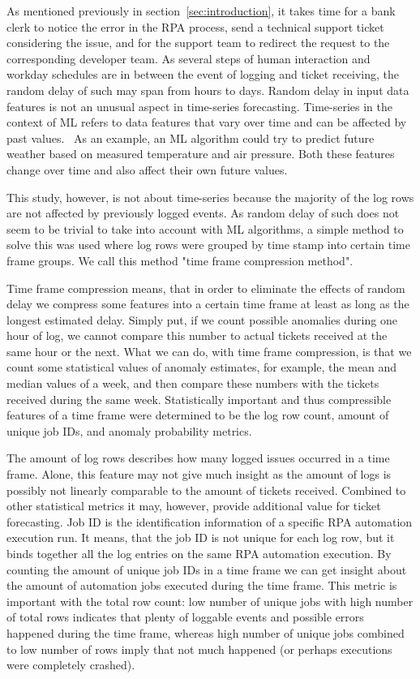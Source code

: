 As mentioned previously in section~\ref{sec:introduction},
it takes time for a bank clerk to notice the error in the RPA process,
send a technical support ticket considering the issue,
and for the support team to redirect the request to the corresponding developer team.
As several steps of human interaction and workday schedules
are in between the event of logging and ticket receiving,
the random delay of such may span from hours to days.
Random delay in input data features
is not an unusual aspect in time-series forecasting.
Time-series in the context of ML
refers to data features that vary over time
and can be affected by past values.~\cite{palma2016time}
As an example,
an ML algorithm could try to predict future weather
based on measured temperature and air pressure.
Both these features change over time
and also affect their own future values.

This study, however,
is not about time-series
because the majority of the log rows
are not affected by previously logged events.
As random delay of such
does not seem to be trivial to take into account
with ML algorithms,
a simple method to solve this was used
where log rows were grouped by time stamp
into certain time frame groups.
We call this method "time frame compression method".

Time frame compression means,
that in order to eliminate the effects of random delay
we compress some features into a certain time frame
at least as long as the longest estimated delay.
Simply put,
if we count possible anomalies during one hour of log,
we cannot compare this number to actual tickets received
at the same hour or the next.
What we can do,
with time frame compression,
is that we count some statistical values of anomaly estimates,
for example, the mean and median values of a week,
and then compare these numbers with the tickets received
during the same week.
Statistically important and thus compressible features of a time frame
were determined to be the log row count,
amount of unique job IDs, and anomaly probability metrics.

The amount of log rows describes
how many logged issues occurred in a time frame.
Alone,
this feature may not give much insight
as the amount of logs is possibly not linearly comparable
to the amount of tickets received.
Combined to other statistical metrics
it may, however,
provide additional value for ticket forecasting.
Job ID is the identification information of a specific RPA automation execution run.
It means,
that the job ID is not unique for each log row,
but it binds together all the log entries on the same RPA automation execution.
By counting the amount of unique job IDs in a time frame
we can get insight about the amount of automation jobs executed during the time frame.
This metric is important with the total row count:
low number of unique jobs with high number of total rows
indicates that plenty of loggable events and possible errors happened during the time frame,
whereas high number of unique jobs combined to low number of rows
imply that not much happened (or perhaps executions were completely crashed).

